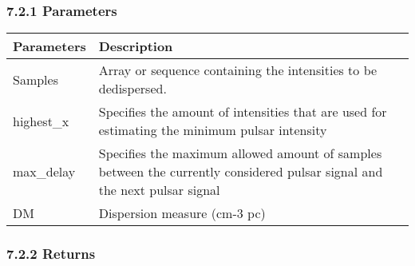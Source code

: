 \documentclass[]{article}
\begin{document}
\subsubsection{7.2.1 Parameters}\label{parameters-4}

\begin{longtable}[]{@{}ll@{}}
\toprule
\begin{minipage}[b]{0.41\columnwidth}\raggedright\strut
Parameters\strut
\end{minipage} & \begin{minipage}[b]{0.41\columnwidth}\raggedright\strut
Description\strut
\end{minipage}\tabularnewline
\midrule
\endhead
\begin{minipage}[t]{0.41\columnwidth}\raggedright\strut
Samples\strut
\end{minipage} & \begin{minipage}[t]{0.41\columnwidth}\raggedright\strut
Array or sequence containing the intensities to be dedispersed.\strut
\end{minipage}\tabularnewline
\begin{minipage}[t]{0.41\columnwidth}\raggedright\strut
highest\_x\strut
\end{minipage} & \begin{minipage}[t]{0.41\columnwidth}\raggedright\strut
Specifies the amount of intensities that are used for estimating the
minimum pulsar intensity\strut
\end{minipage}\tabularnewline
\begin{minipage}[t]{0.41\columnwidth}\raggedright\strut
max\_delay\strut
\end{minipage} & \begin{minipage}[t]{0.41\columnwidth}\raggedright\strut
Specifies the maximum allowed amount of samples between the currently
considered pulsar signal and the next pulsar signal\strut
\end{minipage}\tabularnewline
\begin{minipage}[t]{0.41\columnwidth}\raggedright\strut
DM\strut
\end{minipage} & \begin{minipage}[t]{0.41\columnwidth}\raggedright\strut
Dispersion measure (cm-3 pc)\strut
\end{minipage}\tabularnewline
\bottomrule
\end{longtable}

\subsubsection{7.2.2 Returns}\label{returns-1}
\end{document}
